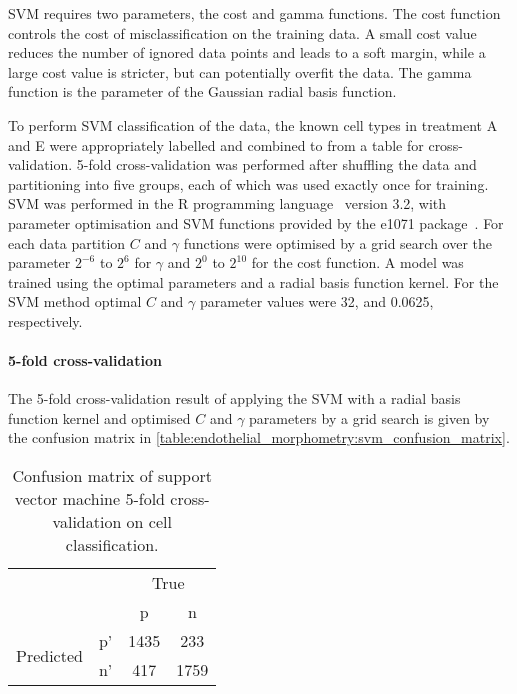 SVM requires two parameters, the cost and gamma functions. The cost function controls the cost of misclassification on the training data. A small cost value reduces the number of ignored data points and leads to a soft margin, while a large cost value is stricter, but can potentially overfit the data. The gamma function is the parameter of the Gaussian radial basis function.

To perform SVM classification of the data, the known cell types in treatment A and E were appropriately labelled and combined to from a table for cross-validation. 5-fold cross-validation was performed after shuffling the data and partitioning into five groups, each of which was used exactly once for training. SVM was performed in the R programming language~\cite{RCoreTeam2014} version 3.2, with parameter optimisation and SVM functions provided by the e1071 package~\cite{Hornik2015}. For each data partition $C$ and $\gamma$ functions were optimised by a grid search over the parameter $2^{-6}$ to $2^{6}$ for $\gamma$ and $2^{0}$ to $2^{10}$ for the cost function. A model was trained using the optimal parameters and a radial basis function kernel. For the SVM method optimal $C$ and $\gamma$ parameter values were 32, and 0.0625, respectively.

\paragraph{5-fold cross-validation}
The 5-fold cross-validation result of applying the SVM with a radial basis function kernel and  optimised $C$ and $\gamma$ parameters by a grid search is given by the confusion matrix in \autoref{table:endothelial_morphometry:svm_confusion_matrix}.

\begin{table}[htbp]
\caption[Confusion matrix of SVM cross-validation on cell classification]{Confusion matrix of support vector machine 5-fold cross-validation on cell classification.}
\label{table:endothelial_morphometry:svm_confusion_matrix}
\centering
\begin{tabular}{cc|cc}
	\multicolumn{2}{c}{}&\multicolumn{2}{c}{True}\\
	\multicolumn{2}{c|}{}& p & n\\
	\cline{2-4}
	\multirow{2}{*}{Predicted}& p' & 1435 & 233\\ & n' & 417 & 1759\\
\end{tabular}
\end{table}

